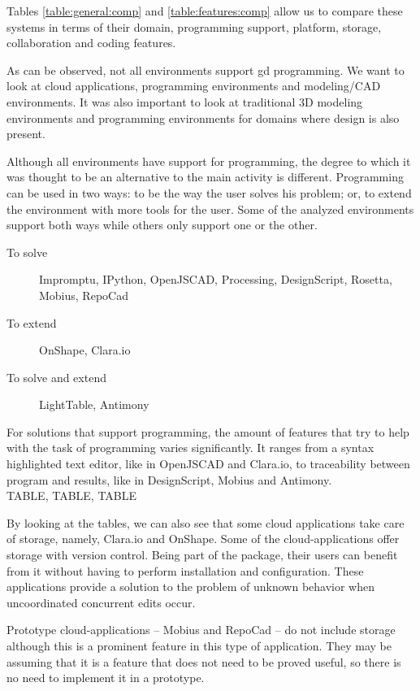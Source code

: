 Tables \ref{table:general:comp} and \ref{table:features:comp} allow us to compare these systems in terms of their domain, programming support, platform, storage, collaboration and coding features.

As can be observed, not all environments support \gls{gd} programming.
We want to look at cloud applications, programming environments and modeling/CAD environments.
It was also important to look at traditional 3D modeling environments and programming environments for domains where design is also present.


Although all environments have support for programming, the degree to which it was thought to be an alternative to the main activity is different.
Programming can be used in two ways: to be the way the user solves his problem; or, to extend the environment with more tools for the user.
Some of the analyzed environments support both ways while others only support one or the other.
\begin{description}
	\item[To solve] Impromptu, IPython, OpenJSCAD, Processing, DesignScript, Rosetta, Mobius, RepoCad
	\item[To extend] OnShape, Clara.io
	\item[To solve and extend] LightTable, Antimony
\end{description}

For solutions that support programming, the amount of features that try to help with the task of programming varies significantly.
It ranges from a syntax highlighted text editor, like in OpenJSCAD and Clara.io, to traceability between program and results, like in DesignScript, Mobius and Antimony.
\\TABLE, TABLE, TABLE


By looking at the tables, we can also see that some cloud applications take care of storage, namely, Clara.io and OnShape.
Some of the cloud-applications offer storage with version control.
Being part of the package, their users can benefit from it without having to perform installation and configuration.
These applications provide a solution to the problem of unknown behavior when uncoordinated concurrent edits occur.

Prototype cloud-applications -- Mobius and RepoCad -- do not include storage although this is a prominent feature in this type of application.
They may be assuming that it is a feature that does not need to be proved useful, so there is no need to implement it in a prototype.

